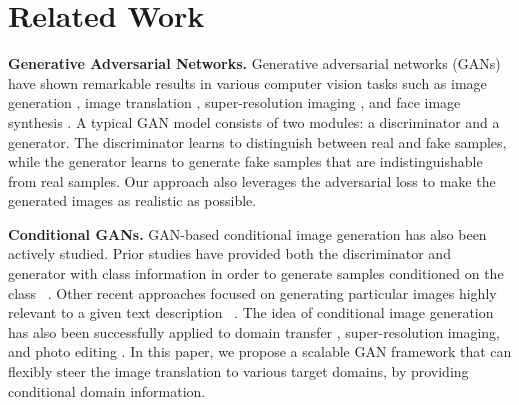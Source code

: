 \documentclass[10pt,twocolumn,letterpaper]{article}
\begin{document}
\vspace{-5px}
\section{Related Work} \label{related work}

\noindent\textbf{Generative Adversarial Networks.} Generative adversarial networks (GANs) \cite{goodfellow2014generative} have shown remarkable results in various computer vision tasks such as image generation \cite{Huang_2017_CVPR,radford2015unsupervised,zhao2016energy,karras2017progressive}, image translation \cite{Isola_2017_CVPR,kim2017learning,zhu2017unpaired}, super-resolution imaging \cite{Ledig_2017_CVPR}, and face image synthesis \cite{kim2017unsupervised,li2016deep,Shen_2017_CVPR,Zhang_2017_CVPR}. A typical GAN model consists of two modules: a discriminator and a generator. The discriminator learns to distinguish between real and fake samples, while the generator learns to generate fake samples that are indistinguishable from real samples. Our approach also leverages the adversarial loss to make the generated images as realistic as possible.

\medskip

\noindent\textbf{Conditional GANs.} GAN-based conditional image generation has also been actively studied. Prior studies have provided both the discriminator and generator with class information in order to generate samples conditioned on the class ~\cite{mirza2014conditional,odena2016semi,odena2016conditional}. Other recent approaches focused on generating particular images highly relevant to a given text description ~\cite{reed2016generative,zhang2016stackgan}. The idea of conditional image generation has also been successfully applied to domain transfer \cite{kim2017learning,taigman2016unsupervised}, super-resolution imaging\cite{Ledig_2017_CVPR}, and photo editing \cite{brock2016neural,Shu_2017_CVPR}.
In this paper, we propose a scalable GAN framework that can flexibly steer the image translation to various target domains, by providing conditional domain information. 

\medskip
\end{document}
